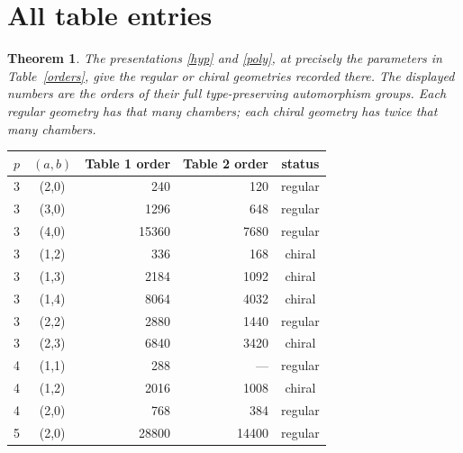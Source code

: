 \documentclass[11pt,a4paper]{article}
\newtheorem{theorem}{Theorem}\newtheorem{proposition}[theorem]{Proposition}
\begin{document}
\section{All table entries}
\begin{theorem}\label{tables}
The presentations \eqref{hyp} and \eqref{poly}, at precisely the parameters
in Table~\ref{orders}, give the regular or chiral geometries recorded there.
The displayed numbers are the orders of their full type-preserving
automorphism groups. Each regular geometry has that many chambers;
each chiral geometry has twice that many chambers.
\end{theorem}
\begin{center}
\begin{tabular}{ccrrc}\toprule
$p$&$(a,b)$&Table 1 order&Table 2 order&status\\\midrule
3&(2,0)&240&120&regular\\
3&(3,0)&1296&648&regular\\
3&(4,0)&15360&7680&regular\\
3&(1,2)&336&168&chiral\\
3&(1,3)&2184&1092&chiral\\
3&(1,4)&8064&4032&chiral\\
3&(2,2)&2880&1440&regular\\
3&(2,3)&6840&3420&chiral\\
4&(1,1)&288&---&regular\\
4&(1,2)&2016&1008&chiral\\
4&(2,0)&768&384&regular\\
5&(2,0)&28800&14400&regular\\\bottomrule
\end{tabular}
\label{orders}
\end{center}
\end{document}
